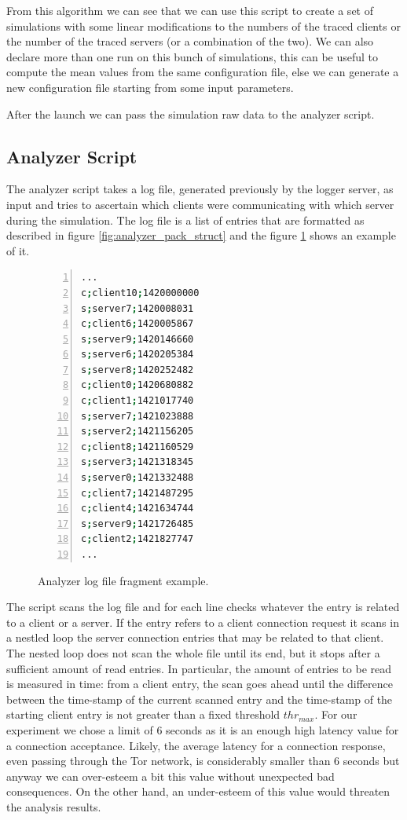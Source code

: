 From this algorithm we can see that we can use this script to create a set of
simulations with some linear modifications to the numbers of the traced clients
or the number of the traced servers (or a combination of the two).
We can also declare more than one run on this bunch of simulations, this can
be useful to compute the mean values from the same configuration file, else we
can generate a new configuration file starting from some input parameters.

After the launch we can pass the simulation raw data to the analyzer script.

\subsection{Analyzer Script}
The analyzer script takes a log file, generated previously by the logger
server, as input and tries to
ascertain which clients were communicating with which server during the
simulation. The log file is a list of entries that are formatted as described in
 figure \ref{fig:analyzer_pack_struct} and the figure
\ref{fig:example_log_file} shows an example of it.
\begin{figure}[H]
\centering
\begin{lstlisting}[language=bash,frame=single, numbers=left]
...
c;client10;1420000000
s;server7;1420008031
c;client6;1420005867
s;server9;1420146660
s;server6;1420205384
s;server8;1420252482
c;client0;1420680882
c;client1;1421017740
s;server7;1421023888
s;server2;1421156205
c;client8;1421160529
s;server3;1421318345
s;server0;1421332488
c;client7;1421487295
c;client4;1421634744
s;server9;1421726485
c;client2;1421827747
...
\end{lstlisting}
\caption{Analyzer log file fragment example.}
\label{fig:example_log_file}
\end{figure}
The script scans the log file and for each line checks whatever the entry is
related to a client or a server. If the entry refers to a client
connection request it scans in a nestled loop the server connection entries
that may be related to that client. The nested loop does not scan the whole
file until its end, but it stops after a sufficient amount of
read entries. In particular, the amount of entries to be read is
measured in time: from a client entry, the scan goes
ahead until the difference between the time-stamp of the current scanned 
entry and the time-stamp of the starting client entry is not greater
than a fixed threshold $thr_{max}$. For our experiment we chose a limit of 6
seconds as it is an enough high latency
value for a connection acceptance. Likely, the average latency for a
connection response, even passing through the Tor network, is
considerably smaller than 6 seconds but anyway we can over-esteem a bit this
value without unexpected bad consequences. On the other hand, an under-esteem of
this value would threaten the analysis results. 

